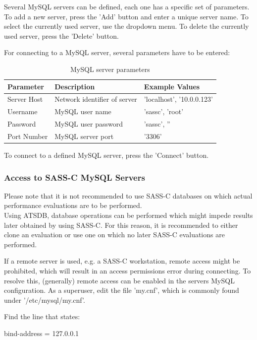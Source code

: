 Several MySQL servers can be defined, each one has a specific set of parameters. To add a new server, press the 'Add' button and enter a unique server name. To select the currently used server, use the dropdown menu. To delete the currently used server, press the 'Delete' button.

For connecting to a MySQL server, several parameters have to be entered:

\begin{table}[H]
  \center
  \begin{tabular}{ | l | l | l |}
    \hline
    \textbf{Parameter} & \textbf{Description} & \textbf{Example Values} \\ \hline
    Server Host & Network identifier of server & 'localhost', '10.0.0.123' \\ \hline
    Username & MySQL user name & 'sassc', 'root' \\ \hline
    Password & MySQL user password & 'sassc', '' \\ \hline
    Port Number & MySQL server port & '3306' \\
    \hline
  \end{tabular}
  \caption{MySQL server parameters}
\end{table}

To connect to a defined MySQL server, press the 'Connect' button.\\

\subsubsection{Access to SASS-C MySQL Servers}

Please note that it is not recommended to use SASS-C databases on which actual performance evaluations are to be performed. \\
Using ATSDB, database operations can be performed which might impede results later obtained by using SASS-C. For this reason, it is recommended to either clone an evaluation or use one on which no later SASS-C evaluations are performed.

If a remote server is used, e.g. a SASS-C workstation, remote access might be prohibited, which will result in an access permissions error during connecting. To resolve this, (generally) remote access can be enabled in the servers MySQL configuration. As a superuser, edit the file 'my.cnf', which is commonly found under '/etc/mysql/my.cnf'. 

Find the line that states:
\begin{cverbatim}
bind-address = 127.0.0.1
\end{cverbatim}

